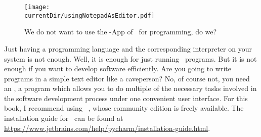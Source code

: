 %
\label{sec:installingPyCharm}%
%
\begin{figure}%
\centering%
\texttt{[image: \\currentDir/usingNotepadAsEditor.pdf]}%
\caption{We do not want to use the \nobreakdashes-App of \microsoftWindows\ for programming, do we?}%
\label{fig:usingNotepadAsEditor}%
\end{figure}%
%
Just having a programming language and the corresponding interpreter on your system is not enough.
Well, it is enough for just running \python\ programs.
But it is not enough if you want to develop software efficiently.
Are you going to write programs in a simple text editor like a caveperson?
No, of course not, you need an , a program which allows you to do multiple of the necessary tasks involved in the software development process under one convenient user interface.
For this book, I recommend using \pycharm~\cite{VHN2023HOADWP,Y2022PPADT,W2024PME}, whose community edition is freely available.
The installation guide for \pycharm\ can be found at \url{https://www.jetbrains.com/help/pycharm/installation-guide.html}.%
%
%
%
\FloatBarrier%
\endhsection%
%
